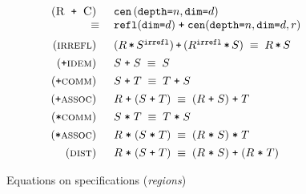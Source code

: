 \documentclass[9pt,preprint]{sigplanconf}
\theoremstyle{definition}
\newcommand{\term}[1]{\texttt{#1}}
\newcommand{\stenCenS}[2]{\term{cen} \, (\term{depth=}#1,
  \term{dim=}#2)}
\newcommand{\irreflS}{\texttt{irrefl}}
\newcommand{\stenCenSR}[3]{\term{cen} (\term{depth=}#1,
  \term{dim=}#2, #3)}
\newcommand{\stenReflSR}[1]{\term{refl} (\term{dim=}#1)}
\begin{document}
\begin{figure}
\begin{align*}
\begin{array}{c}
\begin{array}{rll}
%
%
(\textsc{R\, \texttt{+} \,C}) \;\; &
\stenCenS{n}{d} \\
\equiv \; & \stenReflSR{d} \; \texttt{+} \; \stenCenSR{n}{d}{r} \\[0.6em]
%
%
(\textsc{irrefl}) \;\; & (R \, \term{*} \, S^\irreflS) \, \term{+} \,
                         (R^\irreflS \, \term{*} \, S) \;
\equiv \; R \, \term{*} \, S \\[0.4em]
%
%
(\texttt{+}\textsc{idem}) \;\; & S \; \texttt{+} \; S \; \equiv \; S \\[0.4em]
%
(\texttt{+}\textsc{comm}) \;\; & S \; \texttt{+} \; T \; \equiv \; T \;
                       \texttt{+} \; S \\[0.4em]
%
(\texttt{+}\textsc{assoc}) \;\; & R \; \texttt{+} \; (S \; \texttt{+} \; T) \; \equiv \; (R \;
                       \texttt{+} \; S) \; \texttt{+} \; T \\[0.4em]
(\texttt{*}\textsc{comm}) \;\; & S \; \texttt{*} \; T \; \equiv \; T \;
                       \texttt{*} \; S \\[0.4em]
%
(\texttt{*}\textsc{assoc}) \;\; & R \; \texttt{*} \; (S \; \texttt{*} \; T) \; \equiv \; (R \;
                       \texttt{*} \; S) \; \texttt{*} \; T \\[0.4em]
(\textsc{dist}) \;\; & R \; \texttt{*} \; (S \; \texttt{+} \; T) \; \equiv \; (R \;
                       \texttt{*} \; S) \; \texttt{+} \; (R
                       \; \texttt{*} \; T)
\end{array}
%
\end{array}
\end{align*}
\caption{Equations on specifications (\emph{regions})}
\vspace{-0.5em}
\label{fig:equations}
\end{figure}
\end{document}
